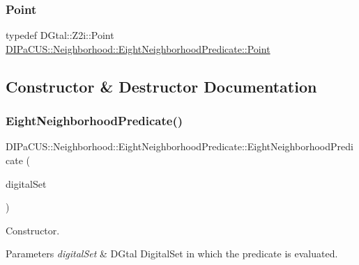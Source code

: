 \subsubsection{\texorpdfstring{Point}{Point}}
{\footnotesize\ttfamily typedef D\+Gtal\+::\+Z2i\+::\+Point \hyperlink{classDIPaCUS_1_1Neighborhood_1_1EightNeighborhoodPredicate_af9c9177298acef079066017d8e5b36c8}{D\+I\+Pa\+C\+U\+S\+::\+Neighborhood\+::\+Eight\+Neighborhood\+Predicate\+::\+Point}}



\subsection{Constructor \& Destructor Documentation}
\mbox{\label{classDIPaCUS_1_1Neighborhood_1_1EightNeighborhoodPredicate_a7300b6672846f5f7d66d2c4e700c520d}} 
\subsubsection{\texorpdfstring{Eight\+Neighborhood\+Predicate()}{EightNeighborhoodPredicate()}}
{\footnotesize\ttfamily D\+I\+Pa\+C\+U\+S\+::\+Neighborhood\+::\+Eight\+Neighborhood\+Predicate\+::\+Eight\+Neighborhood\+Predicate (\begin{DoxyParamCaption}\item[{const \hyperlink{classDIPaCUS_1_1Neighborhood_1_1EightNeighborhoodPredicate_aa42d6c0cf104dd76dd52278138bdd7a4}{Digital\+Set} \&}]{digital\+Set }\end{DoxyParamCaption})\hspace{0.3cm}{\ttfamily [explicit]}}



Constructor. 


\begin{DoxyParams}{Parameters}
{\em digital\+Set} & D\+Gtal Digital\+Set in which the predicate is evaluated. \\
\hline
\end{DoxyParams}


